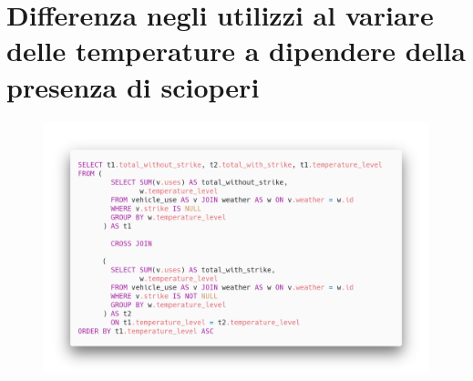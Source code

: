 \section{Differenza negli utilizzi al variare delle temperature a dipendere della presenza di scioperi}
\begin{figure}[H]                                                                                                                                                            
\centering                                                                                                                                                                   
\includegraphics[width=\textwidth]{images/query4}                                                                                                                                   
\label{fig:query4}                                                                                                                                                           
\end{figure}

